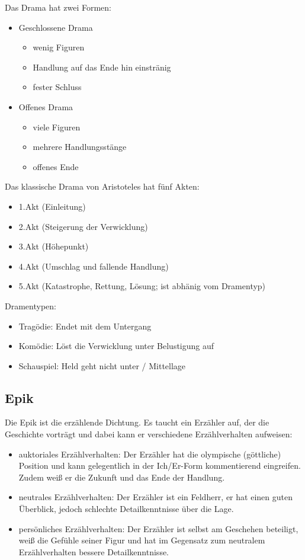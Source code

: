 \documentclass[12pt,a4paper]{article}
\begin{document}
Das Drama hat zwei Formen:

	\begin{itemize}
	\item Geschlossene Drama
		\begin{itemize}
		\item wenig Figuren
		\item Handlung auf das Ende hin einstränig
		\item fester Schluss
		\end{itemize}
	\item Offenes Drama
		\begin{itemize}
		\item viele Figuren
		\item mehrere Handlungsstänge
		\item offenes Ende
		\end{itemize}
	\end{itemize}
	
Das klassische Drama von Aristoteles hat fünf Akten:

	\begin{itemize}
	\item 1.Akt (Einleitung)
	\item 2.Akt (Steigerung der Verwicklung)
	\item 3.Akt (Höhepunkt)
	\item 4.Akt (Umschlag und fallende Handlung)
	\item 5.Akt (Katastrophe, Rettung, Lösung; ist abhänig vom Dramentyp)
	\end{itemize}
	
Dramentypen:

	\begin{itemize}
	\item Tragödie: Endet mit dem Untergang
	\item Komödie: Löst die Verwicklung unter Belustigung auf
	\item Schauspiel: Held geht nicht unter / Mittellage
	\end{itemize}

\subsection{Epik}

Die Epik ist die erzählende Dichtung. Es taucht ein Erzähler auf, der die Geschichte vorträgt und dabei kann er verschiedene Erzählverhalten aufweisen:

	\begin{itemize}
	\item auktoriales Erzählverhalten: Der Erzähler hat die olympische (göttliche) Position und kann gelegentlich in der Ich/Er-Form kommentierend eingreifen. Zudem weiß er die Zukunft und das Ende der Handlung.
	\item neutrales Erzählverhalten: Der Erzähler ist ein Feldherr, er hat einen guten Überblick, jedoch schlechte Detailkenntnisse über die Lage.
	\item persönliches Erzählverhalten: Der Erzähler ist selbst am Geschehen  beteiligt, weiß die Gefühle seiner Figur und hat im Gegensatz zum neutralem Erzählverhalten bessere Detailkenntnisse.
	\end{itemize}
	
\end{document}
